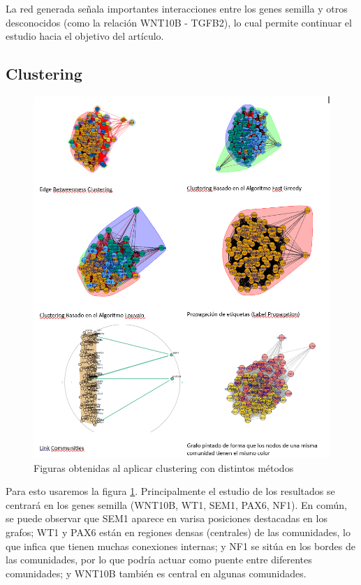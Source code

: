 La red generada señala importantes interacciones entre los genes semilla y otros desconocidos (como la relación WNT10B - TGFB2), lo cual permite continuar el estudio hacia el objetivo del artículo.


\subsection{Clustering}

\begin{figure}[!h] %
	\centering
	\includegraphics[width=1\textwidth]{figures/toda_figuras_clustering.png}
	\caption{Figuras obtenidas al aplicar clustering con distintos métodos}
	\label{clustering}
\end{figure}

Para esto usaremos la figura \ref{clustering}. Principalmente el estudio de los resultados se centrará en los genes semilla (WNT10B, WT1, SEM1, PAX6, NF1). En común, se puede observar que SEM1 aparece en varisa posiciones destacadas en los grafos; WT1 y PAX6 están en regiones densas (centrales) de las comunidades, lo que infica que tienen muchas conexiones internas; y NF1 se sitúa en los bordes de las comunidades, por lo que podría actuar como puente entre diferentes comunidades; y WNT10B también es central en algunas comunidades.


